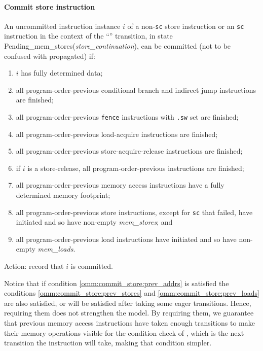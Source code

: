 \paragraph{Commit store instruction}\label{omm:commit_stores}
An uncommitted instruction instance $i$ of a non-{\tt sc} store instruction or an {\tt sc} instruction in the context of the ``'' transition, in state {\sc Pending\_mem\_stores}({\it store\_continuation}), can be committed (not to be confused with propagated) if:
\begin{enumerate}
\item $i$ has fully determined data;
\item all program-order-previous conditional branch and indirect jump instructions are finished;
\item all program-order-previous {\tt fence} instructions with {\tt .sw} set are finished;
\item all program-order-previous load-acquire instructions are finished;
\item all program-order-previous store-acquire-release instructions are finished;
\item  if $i$ is a store-release, all program-order-previous instructions are finished;
\item\label{omm:commit_store:prev_addrs} all program-order-previous memory access instructions have a fully determined memory footprint;
\item\label{omm:commit_store:prev_stores} all program-order-previous store instructions, except for {\tt sc} that failed, have initiated and so have non-empty {\it mem\_stores}; and
\item\label{omm:commit_store:prev_loads} all program-order-previous load instructions have initiated and so have non-empty {\it mem\_loads}.
\end{enumerate}
Action: record that $i$ is committed.

\begin{commentary}
Notice that if condition \ref{omm:commit_store:prev_addrs} is satisfied the conditions \ref{omm:commit_store:prev_stores} and \ref{omm:commit_store:prev_loads} are also satisfied, or will be satisfied after taking some eager transitions.
Hence, requiring them does not strengthen the model.
By requiring them, we guarantee that previous memory access instructions have taken enough transitions to make their memory operations visible for the condition check of , which is the next transition the instruction will take, making that condition simpler.
\end{commentary}


